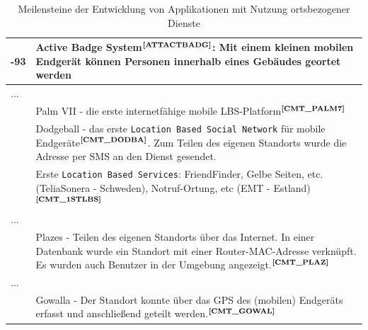 \begin{table}[H]
  \centering
  \begin{tabulary}{\columnwidth}{| >{\centering}m{1.5cm} | L |}
  -93 & Active Badge System$^{\textbf{\ref{ATTACTBADG}}}$: Mit einem kleinen mobilen Endgerät können Personen innerhalb eines Gebäudes geortet werden \\ \hline
    ... &  \\  & Palm VII - die erste internetfähige mobile LBS-Platform$^{\textbf{\ref{CMT_PALM7}}}$\\  & Dodgeball - das erste \texttt{Location Based Social Network} für mobile Endgeräte$^{\textbf{\ref{CMT_DODBA}}}$. Zum Teilen des eigenen Standorts wurde die Adresse per SMS an den Dienst gesendet. \\  & Erste \texttt{Location Based Services}: FriendFinder, Gelbe Seiten, etc. (TeliaSonera - Schweden), Notruf-Ortung, etc (EMT - Estland)$^{\textbf{\ref{CMT_1STLBS}}}$\\ \hline
    ... &  \\  & Plazes - Teilen des eigenen Standorts über das Internet. In einer Datenbank wurde ein Standort mit einer Router-MAC-Adresse verknüpft. Es wurden auch Benutzer in der Umgebung angezeigt.$^{\textbf{\ref{CMT_PLAZ}}}$\\ \hline
    ... &  \\  & Gowalla - Der Standort konnte über das GPS des (mobilen) Endgeräts erfasst und anschließend geteilt werden.$^{\textbf{\ref{CMT_GOWAL}}}$\\ \hline
  \end{tabulary}
  \caption{Meilensteine der Entwicklung von Applikationen mit Nutzung ortsbezogener Dienste}
  \label{LBSHISTORYTABLE}
\end{table}
\addtocounter{footnote}{1}%
\addtocounter{footnote}{1}%
\addtocounter{footnote}{1}%
\addtocounter{footnote}{1}%
\addtocounter{footnote}{1}%

